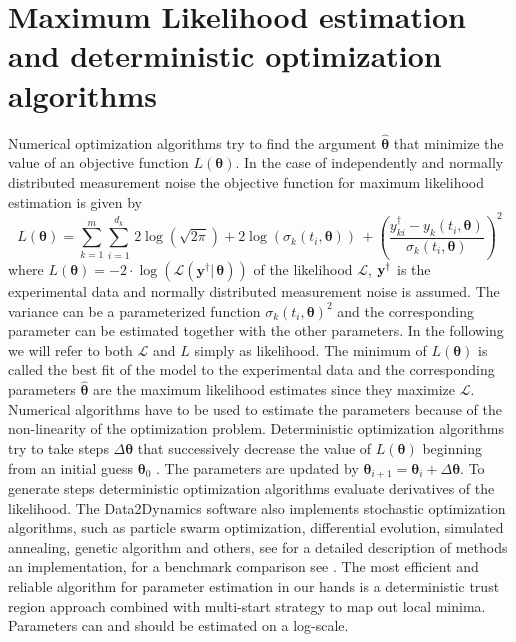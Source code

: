 \documentclass[12pt,a4paper]{scrartcl}
\begin{document}
\section{Maximum Likelihood estimation and deterministic optimization 
algorithms} \label{sec:det_optimization}
Numerical optimization algorithms try to find the argument $\boldsymbol{\hat \theta}$ that 
minimize the value of an objective function $L(\boldsymbol{\theta})$. In the case of 
independently and normally distributed measurement noise the objective function for 
maximum likelihood estimation is given by
\begin{equation}
	L(\boldsymbol{\theta}) = \sum_{k=1}^m \sum_{i=1}^{d_k}\, 2\log(\sqrt{2 \pi}) + 
2\log(\sigma_k(t_i, \boldsymbol{\theta}))\, + \left(\frac{y_{ki}^\dagger - y_{k}(t_{i}, 
\boldsymbol{\theta})}{\sigma_k(t_i, \boldsymbol{\theta})}\right)^2 \label{llhoodfun2}
\end{equation}
where $L(\boldsymbol{\theta}) =  - 2\cdot \log(\mathcal{L}(\mathbf{y}^\dagger|\,
\boldsymbol{\theta}))$ of the likelihood $\mathcal{L}$, ${\bf y}^\dagger$ is the experimental 
data and normally distributed measurement noise is assumed. The variance can be a 
parameterized function $\sigma_k(t_i, \boldsymbol{\theta})^2$ and the corresponding 
parameter can be estimated together with the other parameters. In the following we will 
refer to both $\mathcal{L}$ and $L$ simply as likelihood. The minimum of 
$L(\boldsymbol{\theta})$ is called the best fit of the model to the experimental data and the 
corresponding parameters $\boldsymbol{\hat \theta}$ are the maximum likelihood 
estimates since they maximize $\mathcal{L}$. Numerical algorithms have to be used to 
estimate the parameters because of the non-linearity of the optimization problem. 
Deterministic optimization algorithms try to take steps $\Delta \boldsymbol{\theta}$ that 
successively decrease the value of $L(\boldsymbol{\theta})$ beginning from an initial 
guess $\boldsymbol{\theta}_0$ \citep{Press:1990rw}. The parameters are updated by $
\boldsymbol{\theta}_{i+1} = \boldsymbol{\theta}_{i} + \Delta \boldsymbol{\theta}$. To 
generate steps deterministic optimization algorithms evaluate derivatives of the likelihood. 
The Data2Dynamics software also implements stochastic optimization algorithms, such as
 particle swarm optimization, differential evolution, simulated annealing, genetic algorithm 
 and others, see \citet{Kronfeld:2010fk} for a detailed description of methods an 
 implementation, for a benchmark comparison see \citet{Raue:2012zt}. The most efficient 
 and reliable algorithm for parameter estimation in our hands is a deterministic trust region 
 approach combined with multi-start strategy to map out local minima. Parameters can and 
 should be estimated on a log-scale.
\end{document}
